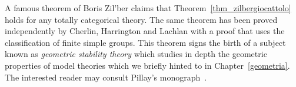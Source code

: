 \documentclass[creche.tex]{subfiles}
\begin{document}
A famous theorem of Boris Zil'ber claims that Theorem~\ref{thm_zilbergiocattolo} holds for any totally categorical theory. The same theorem has been proved independently by  Cherlin, Harrington and Lachlan with a proof that uses the classification of finite simple groups. This theorem signs the birth of a subject known as \textit{geometric stability theory\/} which studies in depth the geometric properties of model theories which we briefly hinted to in Chapter~\ref{geometria}. The interested reader may consult Pillay's monograph~\cite{Pillay}.

\begin{biblist}[]\normalsize


   
\end{biblist}
\end{document}

